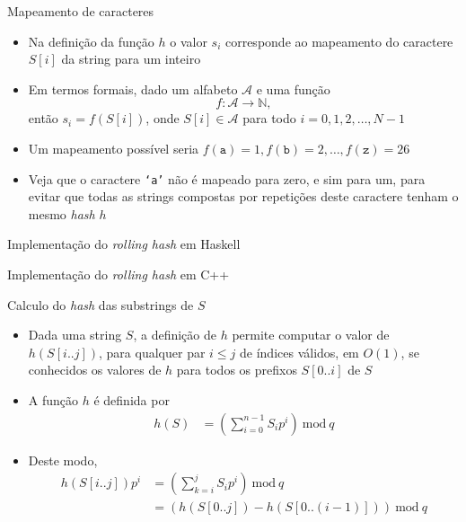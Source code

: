 \begin{frame}[fragile]{Mapeamento de caracteres}

    \begin{itemize}
        \item Na definição da função $h$ o valor $s_i$ corresponde ao mapeamento do caractere
        $S[i]$ da string para um inteiro

        \item Em termos formais, dado um alfabeto $\mathcal{A}$ e uma função
        \[
            f : \mathcal{A} \to \mathbb{N},
        \]
        então $s_i = f(S[i])$, onde $S[i]\in\mathcal{A}$ para todo $i = 0, 1, 2, \ldots, N - 1$

        \item Um mapeamento possível seria $f(\mathtt{a}) = 1, f(\mathtt{b}) = 2, \ldots,
        f(\mathtt{z}) = 26$

        \item Veja que o caractere \texttt{`a'} não é mapeado para zero, e sim para um, para
            evitar que todas as strings compostas por repetições deste caractere tenham o 
            mesmo \textit{hash} $h$
    \end{itemize}

\end{frame}

\begin{frame}[fragile]{Implementação do {\it rolling hash} em Haskell}
\end{frame}

\begin{frame}[fragile]{Implementação do {\it rolling hash} em C++}
\end{frame}

\begin{frame}[fragile]{Calculo do {\it hash} das substrings de $S$}

    \begin{itemize}
        \item Dada uma string $S$, a definição de $h$ permite computar o valor de $h(S[i..j])$,
            para qualquer par $i\leq j$ de índices válidos, em $O(1)$, se conhecidos os valores
            de $h$ para todos os prefixos $S[0..i]$ de $S$
        
        \item A função $h$ é definida por
        \begin{align*}
        h(S) &= \left(\sum_{i=0}^{n - 1} S_ip^i\right)\ \mbox{mod}\ q
        \end{align*}

        \item Deste modo,
        \begin{align*}
        h(S[i..j])p^i &= \left(\sum_{k=i}^{j} S_ip^i\right)\ \mbox{mod}\ q \\
        &= \left(h(S[0..j]) - h(S[0..(i - 1)])\right) \ \mbox{mod}\ q
        \end{align*}
    \end{itemize}

\end{frame}

